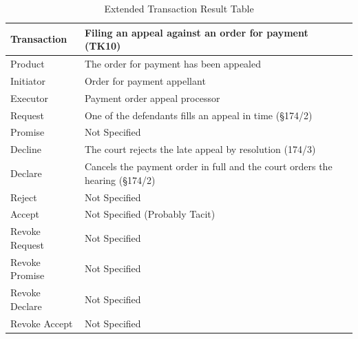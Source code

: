\begin{landscape}
\begin{table}[h]
\caption{Extended Transaction Result Table}
\label{tab:etrt}
\begin{tabular}{|l||l|l|}
\hline
Transaction  &  Filing an appeal against an order for payment (TK10) \\ \hline
Product      &  The order for payment has been appealed \\ \hline
Initiator      &  Order for payment appellant \\ \hline
Executor       &  Payment order appeal processor \\ \hline
Request        & One of the defendants fills an appeal in time (\S174/2)
  \\ \hline
Promise        &    Not Specified   \\ \hline
Decline        & The court rejects the late appeal by resolution (174/3)  \\ \hline
Declare        &  Cancels the payment order in full and the court orders the hearing (\S174/2)  \\ \hline
Reject         &  Not Specified   \\ \hline
Accept         & Not Specified (Probably Tacit) \\ \hline
Revoke Request & Not Specified \\ \hline
Revoke Promise & Not Specified  \\ \hline
Revoke Declare & Not Specified      \\ \hline
Revoke Accept  &  Not Specified \\ \hline
\end{tabular}
\end{table}


\end{landscape}
